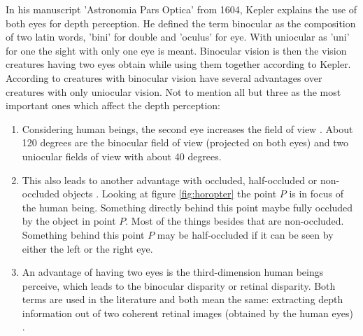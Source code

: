In his manuscript 'Astronomia Pars Optica' from 1604, Kepler explains the use of both eyes for depth perception.
He defined the term binocular as the composition of two latin words, 'bini' for double and 'oculus' for eye.
With uniocular as 'uni' for one the sight with only one eye is meant.
Binocular vision is then the vision creatures having two eyes obtain while using them together according to Kepler.
According to \citeauthor{fahle1987wozu, henson2000visual} creatures with binocular vision have several advantages over creatures with only uniocular vision.
Not to mention all but three as the most important ones which affect the depth perception:

\begin{enumerate}
  \item Considering human beings, the second eye increases the field of view \citep{henson2000visual}. About 120 degrees are the binocular field of view (projected on both eyes) and two uniocular fields of view with about 40 degrees.
  \item This also leads to another advantage with occluded, half-occluded or non-occluded objects \citep{fahle1987wozu}. Looking at figure \ref{fig:horopter} the point $P$ is in focus of the human being. Something directly behind this point maybe fully occluded by the object in point $P$. Most of the things besides that are non-occluded. Something behind this point $P$ may be half-occluded if it can be seen by either the left or the right eye.
  \item An advantage of having two eyes is the third-dimension human beings perceive, which leads to the binocular disparity or retinal disparity. Both terms are used in the literature and both mean the same: extracting depth information out of two coherent retinal images (obtained by the human eyes) \citep{cyganek2011introduction, fahle1987wozu}.
\end{enumerate}

